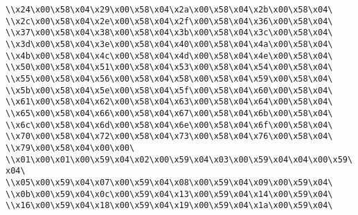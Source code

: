 \verb|\\x24\x00\x58\x04\x29\x00\x58\x04\x2a\x00\x58\x04\x2b\x00\x58\x04\|\newline
\verb|\\x2c\x00\x58\x04\x2e\x00\x58\x04\x2f\x00\x58\x04\x36\x00\x58\x04\|\newline
\verb|\\x37\x00\x58\x04\x38\x00\x58\x04\x3b\x00\x58\x04\x3c\x00\x58\x04\|\newline
\verb|\\x3d\x00\x58\x04\x3e\x00\x58\x04\x40\x00\x58\x04\x4a\x00\x58\x04\|\newline
\verb|\\x4b\x00\x58\x04\x4c\x00\x58\x04\x4d\x00\x58\x04\x4e\x00\x58\x04\|\newline
\verb|\\x50\x00\x58\x04\x51\x00\x58\x04\x53\x00\x58\x04\x54\x00\x58\x04\|\newline
\verb|\\x55\x00\x58\x04\x56\x00\x58\x04\x58\x00\x58\x04\x59\x00\x58\x04\|\newline
\verb|\\x5b\x00\x58\x04\x5e\x00\x58\x04\x5f\x00\x58\x04\x60\x00\x58\x04\|\newline
\verb|\\x61\x00\x58\x04\x62\x00\x58\x04\x63\x00\x58\x04\x64\x00\x58\x04\|\newline
\verb|\\x65\x00\x58\x04\x66\x00\x58\x04\x67\x00\x58\x04\x6b\x00\x58\x04\|\newline
\verb|\\x6c\x00\x58\x04\x6d\x00\x58\x04\x6e\x00\x58\x04\x6f\x00\x58\x04\|\newline
\verb|\\x70\x00\x58\x04\x72\x00\x58\x04\x73\x00\x58\x04\x76\x00\x58\x04\|\newline
\verb|\\x79\x00\x58\x04\x00\x00\|\newline
\verb|\\x01\x00\x01\x00\x59\x04\x02\x00\x59\x04\x03\x00\x59\x04\x04\x00\x59\x04\|\newline
\verb|\\x05\x00\x59\x04\x07\x00\x59\x04\x08\x00\x59\x04\x09\x00\x59\x04\|\newline
\verb|\\x0b\x00\x59\x04\x0c\x00\x59\x04\x13\x00\x59\x04\x14\x00\x59\x04\|\newline
\verb|\\x16\x00\x59\x04\x18\x00\x59\x04\x19\x00\x59\x04\x1a\x00\x59\x04\|\newline
